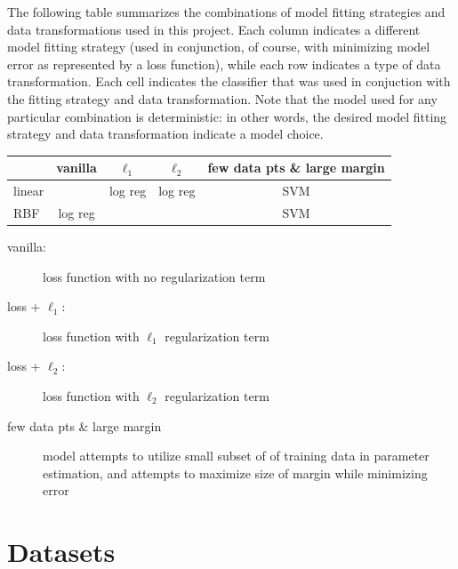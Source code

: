 \documentclass[letterpaper, 12pt]{article}
\begin{document}
The following table summarizes the combinations of model fitting strategies and data transformations used in this project. Each column indicates a different model fitting strategy (used in conjunction, of course, with minimizing model error as represented by a loss function), while each row indicates a type of data transformation. Each cell indicates the classifier that was used in conjuction with the fitting strategy and data transformation. Note that the model used for any particular combination is deterministic: in other words, the desired model fitting strategy and data transformation indicate a model choice.

\begin{center}
  \begin{tabular}{l|c|c|c|c|}
         & vanilla & $\ell_1$ & $\ell_2$ & few data pts \& large margin \\
\hline
  linear &         & log reg  & log reg  & SVM \\
\hline
  RBF    & log reg &          &          & SVM \\
\hline
\end{tabular}
\end{center}

\begin{description}
\item[vanilla:] loss function with no regularization term \\
\item[loss + $\ell_1$:] loss function with $\ell_1$ regularization term \\
\item[loss + $\ell_2$:] loss function with $\ell_2$ regularization term
\item[few data pts \& large margin] model attempts to utilize small subset of of training data in parameter estimation, and attempts to maximize size of margin while minimizing error 
\end{description}

\section{Datasets}
\end{document}
